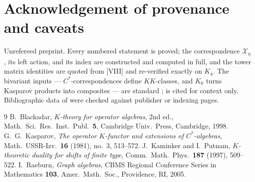 \documentclass[11pt]{amsart}
\numberwithin{equation}{section}
\theoremstyle{definition}
\theoremstyle{remark}
\newcommand{\cX}{\mathcal{X}}
\newcommand{\KK}{\mathit{KK}}
\begin{document}
\section*{Acknowledgement of provenance and caveats}

Unrefereed preprint. Every numbered statement is proved; the correspondence $\cX_\eta$, its
left action, and its index are constructed and computed in full, and the tower matrix
identities are quoted from [VIII] and re-verified exactly on $K_4$. The bivariant inputs
--- $C^*$-correspondences define $\KK$-classes, and $K_0$ turns Kasparov products into
composites --- are standard \cite{Kas,Bla}; \cite{KP} is cited for context only.
Bibliographic data of \cite{Kas,Bla,R,KP} were checked against publisher or indexing pages.

\begin{thebibliography}{9}
 B.~Blackadar, \emph{$K$-theory for operator algebras}, 2nd ed., Math.\ Sci.\
Res.\ Inst.\ Publ.\ \textbf{5}, Cambridge Univ.\ Press, Cambridge, 1998.
\bibitem{Kas} G.~G.~Kasparov, \emph{The operator $K$-functor and extensions of
$C^*$-algebras}, Math.\ USSR-Izv.\ \textbf{16} (1981), no.~3, 513--572.
\bibitem{KP} J.~Kaminker and I.~Putnam, \emph{$K$-theoretic duality for shifts of finite
type}, Comm.\ Math.\ Phys.\ \textbf{187} (1997), 509--522.
 I.~Raeburn, \emph{Graph algebras}, CBMS Regional Conference Series in
Mathematics \textbf{103}, Amer.\ Math.\ Soc., Providence, RI, 2005.
\end{thebibliography}
\end{document}
